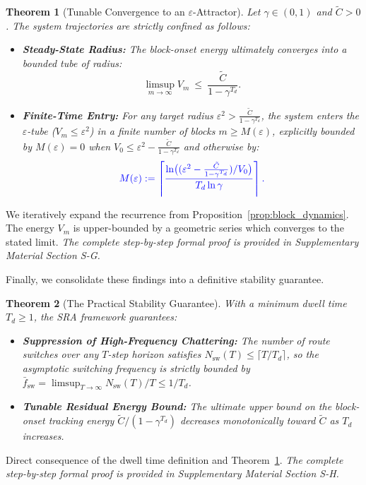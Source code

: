 \documentclass[journal]{IEEEtran}
\theoremstyle{plain}
\newtheorem{theorem}{Theorem}
\theoremstyle{definition}
\newcommand{\rev}[1]{{\color{blue}#1}}
\begin{document}
\begin{theorem}[Tunable Convergence to an $\varepsilon$-Attractor]
\label{thm:epsilon_tube}
Let $\gamma \in (0,1)$ and $\tilde C > 0$. The system trajectories are strictly confined as follows:
\begin{itemize}
    \item[\textit{(a)}] \textbf{Steady-State Radius:} The block-onset energy ultimately converges into a bounded tube of radius:
    \begin{equation}\label{eq:limsup_radius}
    \limsup_{m\to\infty}V_m\ \le\ \frac{\tilde C}{1-\gamma^{T_d}}.
    \end{equation}
    \item[\textit{(b)}] \textbf{Finite-Time Entry:} For any target radius $\varepsilon^2 > \frac{\tilde C}{1-\gamma^{T_d}}$, the system enters the $\varepsilon$-tube ($V_m \le \varepsilon^2$) in a finite number of blocks $m \ge M(\varepsilon)$, explicitly bounded by $M(\varepsilon)=0$ when $V_0 \le \varepsilon^2 - \frac{\tilde C}{1-\gamma^{T_d}}$ and otherwise by:
    \begin{equation}\label{eq:finite_time_blocks}
    \rev{M(\varepsilon) := \left\lceil \frac{\ln\!\big((\varepsilon^2 - \frac{\tilde C}{1-\gamma^{T_d}})/V_0\big)}{T_d \ln \gamma} \right\rceil.}
    \end{equation}
\end{itemize}
\end{theorem}
\begin{IEEEproof}
We iteratively expand the recurrence from Proposition~\ref{prop:block_dynamics}. The energy $V_m$ is upper-bounded by a geometric series which converges to the stated limit. \textit{The complete step-by-step formal proof is provided in Supplementary Material Section S-G.}
\end{IEEEproof}

Finally, we consolidate these findings into a definitive stability guarantee.

\begin{theorem}[The Practical Stability Guarantee]
\label{thm:practical_stability}
With a minimum dwell time $T_d \ge 1$, the SRA framework guarantees:
\begin{itemize}
    \item[\textit{(a)}] \textbf{Suppression of High-Frequency Chattering:} \rev{The number of route switches over any $T$-step horizon satisfies $N_{\text{sw}}(T) \le \lceil T/T_d \rceil$, so the asymptotic switching frequency is strictly bounded by $\bar{f}_{\text{sw}} = \limsup_{T\to\infty} N_{\text{sw}}(T)/T \le 1/T_d$.}
    \item[\textit{(b)}] \textbf{Tunable Residual Energy Bound:} \rev{The ultimate upper bound on the block-onset tracking energy $\tilde{C}/(1-\gamma^{T_d})$ decreases monotonically toward $\tilde{C}$ as $T_d$ increases.}
\end{itemize}
\end{theorem}
\begin{IEEEproof}
Direct consequence of the dwell time definition and Theorem~\ref{thm:epsilon_tube}. \textit{The complete step-by-step formal proof is provided in Supplementary Material Section S-H.}
\end{IEEEproof}
\end{document}
